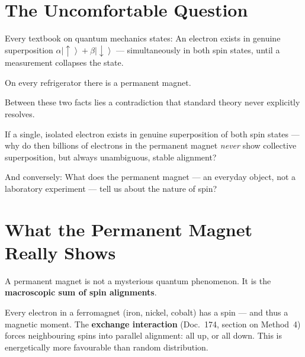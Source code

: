 
\providecommand{\ket}[1]{\left|#1\right\rangle}
\providecommand{\bra}[1]{\left\langle#1\right|}
\providecommand{\braket}[2]{\left\langle#1\middle|#2\right\rangle}

\section{The Uncomfortable Question}
\label{sec:uncomfortable-question}

Every textbook on quantum mechanics states:
An electron exists in genuine superposition
$\alpha\ket{\uparrow} + \beta\ket{\downarrow}$ ---
simultaneously in both spin states,
until a measurement collapses the state.

On every refrigerator there is a permanent magnet.

Between these two facts lies a contradiction
that standard theory never explicitly resolves.

\begin{significance}
If a single, isolated electron exists in genuine superposition
of both spin states ---
why do then billions of electrons
in the permanent magnet \emph{never} show collective superposition,
but always unambiguous, stable alignment?

And conversely:
What does the permanent magnet --- an everyday object,
not a laboratory experiment --- tell us about the nature of spin?
\end{significance}

\section{What the Permanent Magnet Really Shows}
\label{sec:permanent-magnet}

A permanent magnet is not a mysterious quantum phenomenon.
It is the \textbf{macroscopic sum of spin alignments}.

Every electron in a ferromagnet (iron, nickel, cobalt)
has a spin --- and thus a magnetic moment.
The \textbf{exchange interaction} (Doc.~174,
section on Method~4) forces neighbouring spins
into parallel alignment: all up, or all down.
This is energetically more favourable than random distribution.


